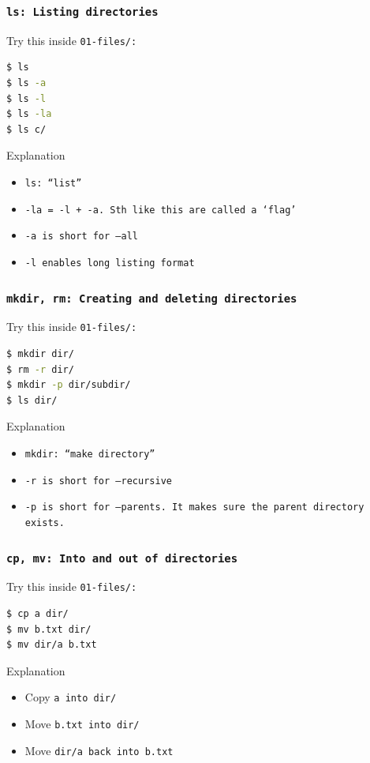 \begin{frame}[fragile]
\frametitle{\tt{ls}: Listing directories}
Try this inside \tt{01-files/}:
\begin{lstlisting}[language=bash]
$ ls
$ ls -a
$ ls -l
$ ls -la
$ ls c/
\end{lstlisting}
\begin{block}{Explanation}
    \begin{itemize}
        \item \tt{ls}: ``list''
        \item \tt{-la} = \tt{-l} + \tt{-a}. Sth like this are called a `flag'
        \item \tt{-a} is short for \tt{--all}
        \item \tt{-l} enables long listing format
    \end{itemize}
\end{block}
\end{frame}

\begin{frame}[fragile]
\frametitle{\tt{mkdir, rm}: Creating and deleting directories}
Try this inside \tt{01-files/}:
\begin{lstlisting}[language=bash]
$ mkdir dir/
$ rm -r dir/
$ mkdir -p dir/subdir/
$ ls dir/
\end{lstlisting}
\begin{block}{Explanation}
    \begin{itemize}
        \item \tt{mkdir}: ``make directory''
        \item \tt{-r} is short for \tt{--recursive}
        \item \tt{-p} is short for \tt{--parents}. It makes sure the parent directory exists.  
    \end{itemize}
\end{block}
\end{frame}

\begin{frame}[fragile]
\frametitle{\tt{cp, mv}: Into and out of directories}
Try this inside \tt{01-files/}:
\begin{lstlisting}[language=bash]
$ cp a dir/
$ mv b.txt dir/
$ mv dir/a b.txt
\end{lstlisting}
\begin{block}{Explanation}
    \begin{itemize}
        \item Copy \tt{a} into \tt{dir/}
        \item Move \tt{b.txt} into \tt{dir/}
        \item Move \tt{dir/a} back into \tt{b.txt}
    \end{itemize}
\end{block}
\end{frame}


